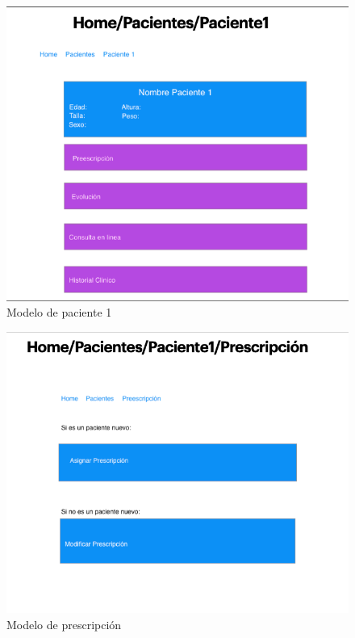 \documentclass[12pt]{article}
\begin{document}
\begin{figure}[ht]
\centering
\includegraphics[scale=0.4]{imag/P5.png}
\caption{Modelo de paciente 1 }
\label{6}
\end{figure}
\FloatBarrier


\begin{figure}[ht]
\centering
\includegraphics[scale=0.4]{imag/P6.png}
\caption{Modelo de prescripción  }
\label{6}
\end{figure}
\FloatBarrier
\end{document}
